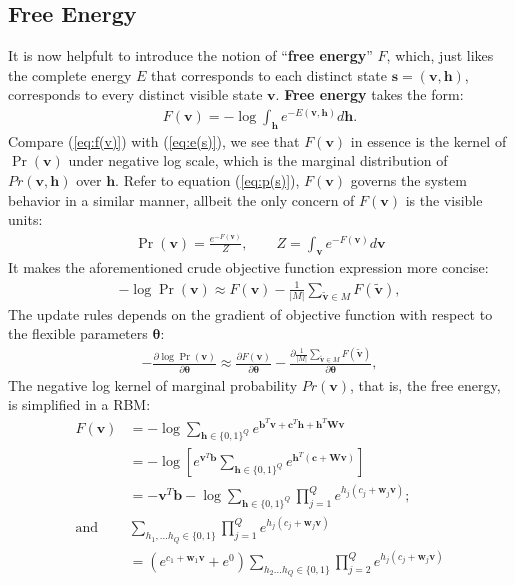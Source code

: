 \documentclass[11pt]{article}
\newcommand{\vb}{\boldsymbol{b}}
\newcommand{\vc}{\boldsymbol{c}}
\newcommand{\vh}{\boldsymbol{h}}
\newcommand{\vv}{\boldsymbol{v}}
\newcommand{\vw}{\boldsymbol{w}}
\newcommand{\vs}{\boldsymbol{s}}
\newcommand{\mw}{\boldsymbol{W}}
\newcommand{\vvt}{\tilde{\vv}}
\newcommand{\pEC}{\boldsymbol{\theta}}
\newcommand{\PDV}[2]{\frac{\partial #1}{\partial #2}}
\begin{document}
{\subsection{Free Energy}
It is now helpfult to introduce the notion of ``\textbf{free energy}'' $F$, which, just likes the complete energy $E$ that corresponds to each distinct state $\vs=(\vv, \vh)$, corresponds to every distinct visible state $\vv$. \textbf{Free energy} takes the form:
\begin{align}\label{eq:f(v)}
    F(\vv) = -\log{\int_{\vh}{e^{-E(\vv, \vh)}d\vh}}.
\end{align}
Compare (\ref{eq:f(v)}) with (\ref{eq:e(s)}), we see that $F(\vv)$ in essence is the kernel of $\Pr(\vv)$ under negative log scale, which is the marginal distribution of $Pr(\vv, \vh)$ over $\vh$. Refer to equation (\ref{eq:p(s)}), $F(\vv)$ governs the system behavior in a similar manner, allbeit the only concern of $F(\vv)$ is the visible units:
\begin{align}\label{eq:p(v)|fe}
    \Pr(\vv) = \frac{e^{-F(\vv)}}{Z}, \quad\quad Z=\int_{\vv}{e^{-F(\vv)}}d\vv
\end{align}
It makes the aforementioned crude objective function expression more concise:
\begin{align}\label{eq:l(v)3}
  -\log{\Pr(\vv)} \approx F(\vv) - \frac{1}{|M|}\sum_{\vvt \in M}{F(\vvt)},
\end{align}
The update rules depends on the gradient of objective function with respect to the flexible parameters $\pEC$:
\begin{align}\label{eq:gv4}
  -\PDV{\log{\Pr(\vv)}}{\pEC} \approx \PDV{F(\vv)}{\pEC} - \PDV{\frac{1}{|M|}\sum_{\vvt \in M}{F(\vvt)}}{\pEC},
\end{align}
The negative log kernel of marginal probability $Pr(\vv)$, that is, the free energy, is simplified in a RBM:
\begin{align*}
  F(\vv) &= -\log{\sum_{\vh\in \{0,1\}^Q}{e^{\vb^T \vv + \vc^T \vh + \vh^T \mw \vv}}} \\
         &= -\log{\left[ e^{\vv^T\vb}\sum_{\vh\in \{0,1\}^Q}{e^{\vh^T(\vc + \mw \vv)}} \right]} \\
         &= -\vv^T\vb - \log{\sum_{\vh\in \{0,1\}^Q}{ \prod_{j=1}^Q{e^{h_j(c_j + \vw_j\vv)}} }}; \\
  \textrm{and} \quad & \sum_{h_1, \dots h_Q \in \{0,1\}}{\prod_{j=1}^Q{e^{h_j(c_j + \vw_j\vv)}}} \\
         &= (e^{c_1+\vw_1\vv}+e^{0}) \sum_{h_2 \dots h_Q \in\{0,1\}}{ \prod_{j=2}^Q{e^{h_j(c_j + \vw_j\vv)}} } \\

\end{align*}}
\end{document}
